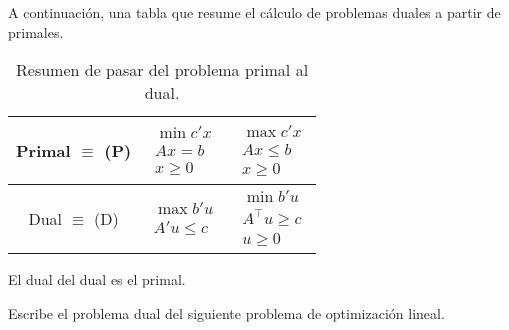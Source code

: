 A continuación, una tabla que resume el cálculo de problemas duales a partir de primales.
\begin{table}[hbtp]
\centering
\begin{tabular}{c|c|c}
	Primal $\equiv$ (P) &
	$\begin{array}{c} \min c'x\\Ax = b\\x≥ 0\end{array}$ & 
	$\begin{array}{c} \max c'x\\Ax ≤ b\\x≥ 0\end{array}$
\\
\hline
	Dual $\equiv$ (D) & 
	$\begin{array}{c} \max b'u\\A'u ≤ c\end{array}$ & 
	$\begin{array}{c} \min b'u\\A^\top u ≥ c\\u≥ 0\end{array}$
\\
\end{tabular}
\caption{Resumen de pasar del problema primal al dual.}
\end{table}

\obs El dual del dual es el primal.

\begin{example}
Escribe el problema dual del siguiente problema de optimización lineal.

\begin{ioprob}
\end{ioprob}



\begin{ioprob}
\end{ioprob}

\end{example}

